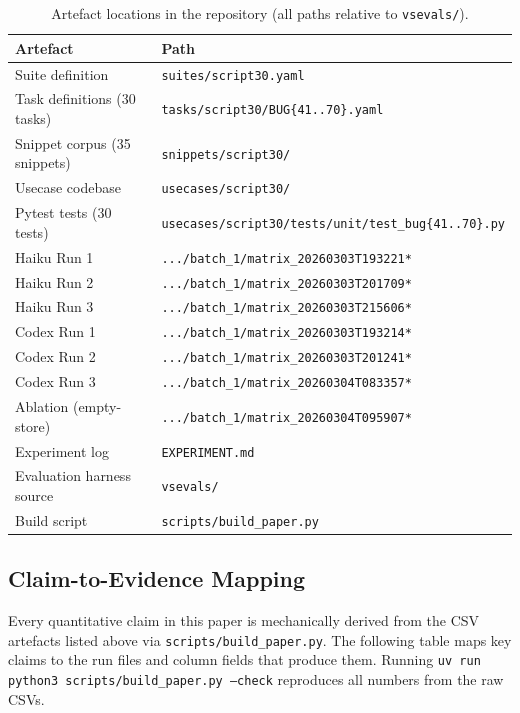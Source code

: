 \documentclass[10pt,a4paper,twocolumn]{article}
\begin{document}
\begin{table}[t]
\centering
\caption{Artefact locations in the repository (all paths relative to \texttt{vsevals/}).}
\label{tab:artefacts}
\footnotesize
\begin{tabular}{@{}lp{7cm}@{}}
\toprule
\textbf{Artefact} & \textbf{Path} \\
\midrule
Suite definition            & \texttt{suites/script30.yaml} \\
Task definitions (30 tasks) & \texttt{tasks/script30/BUG\{41..70\}.yaml} \\
Snippet corpus (35 snippets) & \texttt{snippets/script30/} \\
Usecase codebase            & \texttt{usecases/script30/} \\
Pytest tests (30 tests)     & \texttt{usecases/script30/tests/unit/test\_bug\{41..70\}.py} \\
Haiku Run 1                 & \texttt{.../batch\_1/matrix\_20260303T193221*} \\
Haiku Run 2                 & \texttt{.../batch\_1/matrix\_20260303T201709*} \\
Haiku Run 3                 & \texttt{.../batch\_1/matrix\_20260303T215606*} \\
Codex Run 1                 & \texttt{.../batch\_1/matrix\_20260303T193214*} \\
Codex Run 2                 & \texttt{.../batch\_1/matrix\_20260303T201241*} \\
Codex Run 3                 & \texttt{.../batch\_1/matrix\_20260304T083357*} \\
Ablation (empty-store)      & \texttt{.../batch\_1/matrix\_20260304T095907*} \\
Experiment log              & \texttt{EXPERIMENT.md} \\
Evaluation harness source   & \texttt{vsevals/} \\
Build script                & \texttt{scripts/build\_paper.py} \\
\bottomrule
\end{tabular}
\end{table}

\subsection*{Claim-to-Evidence Mapping}

Every quantitative claim in this paper is mechanically derived from the CSV artefacts listed above via \texttt{scripts/build\_paper.py}.
The following table maps key claims to the run files and column fields that produce them.
Running \texttt{uv run python3 scripts/build\_paper.py --check} reproduces all numbers from the raw CSVs.
\end{document}
